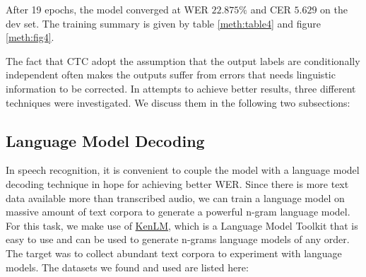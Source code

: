 After 19 epochs, the model converged at \ac{WER} $22.875\%$ and \ac{CER} $5.629$ on the dev set. The training summary is given by table \ref{meth:table4} and figure \ref{meth:fig4}.


The fact that \ac{CTC} adopt the assumption that the output labels are conditionally independent often makes the outputs suffer from errors that needs linguistic information to be corrected. In attempts to achieve better results, three different techniques were investigated. We discuss them in the following two subsections:

\subsection{Language Model Decoding}
\label{meth:s4_sub5}

In speech recognition, it is convenient to couple the model with a language model decoding technique in hope for achieving better \ac{WER}. Since there is more text data available more than transcribed audio, we can train a language model on massive amount of text corpora to generate a powerful n-gram language model. For this task, we make use of \href{https://kheafield.com/code/kenlm/}{KenLM}, which is a Language Model Toolkit that is easy to use and can be used to generate n-grams language models of any order. The target was to collect abundant text corpora to experiment with language models. The datasets we found and used are listed here:

